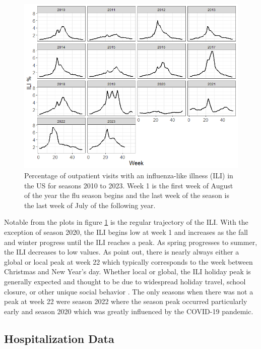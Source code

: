 \documentclass[ba]{imsart}
\theoremstyle{plain}
\theoremstyle{definition}
\theoremstyle{remark}
\begin{document}
\begin{figure}
    \centering
    \includegraphics[scale=.5]{Images/us_ili_seasons.png}
    \caption{Percentage of outpatient visits with an influenza-like illness (ILI) in the US for seasons 2010 to 2023. Week 1 is the first week of August of the year the flu season begins and the last week of the season is the last week of July of the following year.}
    \label{fig:us_ili}
\end{figure}

Notable from the plots in figure \ref{fig:us_ili} is the regular trajectory of the ILI. With the exception of season 2020, the ILI begins low at week 1 and increases as the fall and winter progress until the ILI reaches a peak. As spring progresses to summer, the ILI decreases to low values. As \cite{osthus2019dynamic} point out, there is nearly always either a global or local peak at week 22 which typically corresponds to the week between Christmas and New Year's day. 
Whether local or global, the ILI holiday peak is generally expected and thought to be due to widespread holiday travel, school closure, or other unique social behavior   
\cite[]{ewing2017contact, garza2013effect}.
The only seasons when there was not a peak at week 22 were season 2022 where the season peak occurred particularly early and season 2020 which was greatly influenced by the COVID-19 pandemic. 









\subsection{Hospitalization Data}
\end{document}

